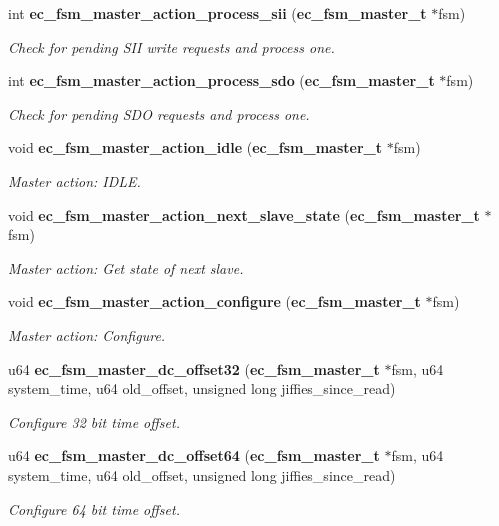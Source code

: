 \begin{DoxyCompactItemize}
int {\bf ec\-\_\-fsm\-\_\-master\-\_\-action\-\_\-process\-\_\-sii} ({\bf ec\-\_\-fsm\-\_\-master\-\_\-t} $\ast$fsm)
\begin{DoxyCompactList}\small\item\em \-Check for pending \-S\-I\-I write requests and process one. \end{DoxyCompactList}\item 
int {\bf ec\-\_\-fsm\-\_\-master\-\_\-action\-\_\-process\-\_\-sdo} ({\bf ec\-\_\-fsm\-\_\-master\-\_\-t} $\ast$fsm)
\begin{DoxyCompactList}\small\item\em \-Check for pending \-S\-D\-O requests and process one. \end{DoxyCompactList}\item 
void {\bf ec\-\_\-fsm\-\_\-master\-\_\-action\-\_\-idle} ({\bf ec\-\_\-fsm\-\_\-master\-\_\-t} $\ast$fsm)
\begin{DoxyCompactList}\small\item\em \-Master action\-: \-I\-D\-L\-E. \end{DoxyCompactList}\item 
void {\bf ec\-\_\-fsm\-\_\-master\-\_\-action\-\_\-next\-\_\-slave\-\_\-state} ({\bf ec\-\_\-fsm\-\_\-master\-\_\-t} $\ast$fsm)
\begin{DoxyCompactList}\small\item\em \-Master action\-: \-Get state of next slave. \end{DoxyCompactList}\item 
void {\bf ec\-\_\-fsm\-\_\-master\-\_\-action\-\_\-configure} ({\bf ec\-\_\-fsm\-\_\-master\-\_\-t} $\ast$fsm)
\begin{DoxyCompactList}\small\item\em \-Master action\-: \-Configure. \end{DoxyCompactList}\item 
u64 {\bf ec\-\_\-fsm\-\_\-master\-\_\-dc\-\_\-offset32} ({\bf ec\-\_\-fsm\-\_\-master\-\_\-t} $\ast$fsm, u64 system\-\_\-time, u64 old\-\_\-offset, unsigned long jiffies\-\_\-since\-\_\-read)
\begin{DoxyCompactList}\small\item\em \-Configure 32 bit time offset. \end{DoxyCompactList}\item 
u64 {\bf ec\-\_\-fsm\-\_\-master\-\_\-dc\-\_\-offset64} ({\bf ec\-\_\-fsm\-\_\-master\-\_\-t} $\ast$fsm, u64 system\-\_\-time, u64 old\-\_\-offset, unsigned long jiffies\-\_\-since\-\_\-read)
\begin{DoxyCompactList}\small\item\em \-Configure 64 bit time offset. \end{DoxyCompactList}\end{DoxyCompactItemize}



